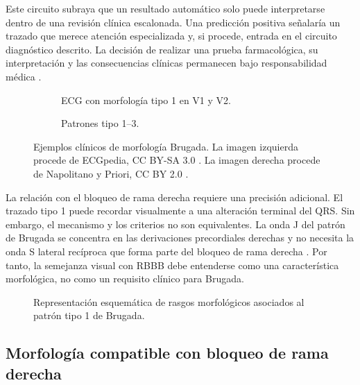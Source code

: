 Este circuito subraya que un resultado automático solo puede interpretarse dentro de una revisión clínica escalonada. Una predicción positiva señalaría un trazado que merece atención especializada y, si procede, entrada en el circuito diagnóstico descrito. La decisión de realizar una prueba farmacológica, su interpretación y las consecuencias clínicas permanecen bajo responsabilidad médica \cite{wilde2023scbt}.

\begin{figure}[H]
  \centering
  \begin{subfigure}[t]{0.58\textwidth}
    \centering
    \caption{ECG con morfología tipo 1 en V1 y V2.}
  \end{subfigure}
  \hfill
  \begin{subfigure}[t]{0.34\textwidth}
    \centering
    \caption{Patrones tipo 1--3.}
  \end{subfigure}
  \caption{Ejemplos clínicos de morfología Brugada. La imagen izquierda procede de ECGpedia, CC BY-SA 3.0 \cite{ecgpediaType1Image}. La imagen derecha procede de Napolitano y Priori, CC BY 2.0 \cite{napolitano2006}.}
  \label{fig:brugada_clinical_examples}
\end{figure}

La relación con el bloqueo de rama derecha requiere una precisión adicional. El trazado tipo 1 puede recordar visualmente a una alteración terminal del QRS. Sin embargo, el mecanismo y los criterios no son equivalentes. La onda J del patrón de Brugada se concentra en las derivaciones precordiales derechas y no necesita la onda S lateral recíproca que forma parte del bloqueo de rama derecha \cite{corrado2010}. Por tanto, la semejanza visual con RBBB debe entenderse como una característica morfológica, no como un requisito clínico para Brugada.

\begin{figure}[H]
  \centering
  \caption{Representación esquemática de rasgos morfológicos asociados al patrón tipo 1 de Brugada.}
  \label{fig:brugada_pattern}
\end{figure}

\subsection{Morfología compatible con bloqueo de rama derecha}

